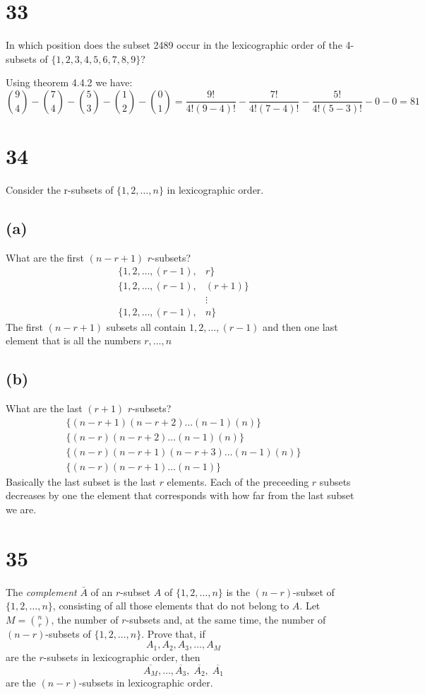 \documentclass{article}
\begin{document}
\section*{33}
In which position does the subset 2489 occur in the lexicographic order of the 4-subsets of $\{1,2,3,4,5,6,7,8,9\}$?

Using theorem 4.4.2 we have:
\[\binom{9}{4}-\binom{7}{4}-\binom{5}{3}-\binom{1}{2}-\binom{0}{1}=\frac{9!}{4!(9-4)!}-\frac{7!}{4!(7-4)!}-\frac{5!}{4!(5-3)!}-0-0=81\]

\section*{34}
Consider the r-subsets of $\{1,2,\dots,n\}$ in lexicographic order.
\subsection*{(a)}
What are the first $(n-r+1)$ $r$-subsets?
\begin{align*}
  \{1,2,\dots, (r-1),&r\}\\
  \{1,2,\dots, (r-1),&(r+1)\}\\
  &\vdots\\
  \{1,2,\dots, (r-1),&n\}
\end{align*}
The first $(n-r+1)$ subsets all contain $1,2,\dots,(r-1)$ and then one last element that is all the numbers $r,\dots,n$
\subsection*{(b)}
What are the last $(r+1)$ $r$-subsets?
\begin{align*}
  \{(n-r+1)(n-r+2)\dots(n-1)(n)\}\\
  \{(n-r)(n-r+2)\dots(n-1)(n)\}\\
  \{(n-r)(n-r+1)(n-r+3)\dots(n-1)(n)\}\\
  \{(n-r)(n-r+1)\dots(n-1)\}
\end{align*}
Basically the last subset is the last $r$ elements. Each of the preceeding $r$ subsets decreases by one the element that corresponds with how far from the last subset we are.
\section*{35}
The \emph{complement} $\bar{A}$ of an $r$-subset $A$ of $\{1,2,\dots,n\}$ is the $(n-r)$-subset of $\{1,2,\dots,n\}$, consisting of all those elements that do not belong to $A$. Let $M=\binom{n}{r}$, the number of $r$-subsets and, at the same time, the number of $(n-r)$-subsets of $\{1,2,\dots,n\}$. Prove that, if
\[A_1,A_2,A_3,\dots,A_M\]
are the $r$-subsets in lexicographic order, then
\[\overline{A_M},\dots,\overline{A_3},\;\overline{A_2},\;\overline{A_1}\]
are the $(n-r)$-subsets in lexicographic order.
\end{document}
